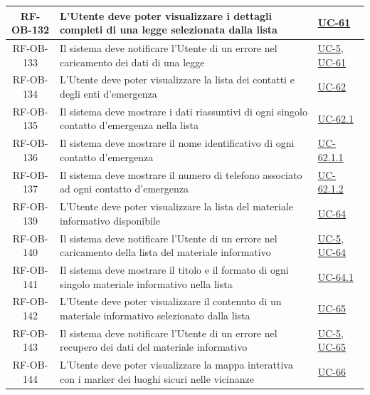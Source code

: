 \documentclass[a4paper,12pt]{article}
\begin{document}
\begin{center}
\begin{longtable}{|c|p{8.5cm}|>{\centering\arraybackslash}p{4cm}|}
RF-OB-132 & L'Utente deve poter visualizzare i dettagli completi di una legge selezionata dalla lista & \hyperref[sec:UC-61]{UC-61} \\
\hline

RF-OB-133 & Il sistema deve notificare l'Utente di un errore nel caricamento dei dati di una legge & \hyperref[sec:UC-5]{UC-5}, \hyperref[sec:UC-61]{UC-61} \\
\hline

RF-OB-134 & L'Utente deve poter visualizzare la lista dei contatti e degli enti d'emergenza & \hyperref[sec:UC-62]{UC-62} \\
\hline

RF-OB-135 & Il sistema deve mostrare i dati riassuntivi di ogni singolo contatto d'emergenza nella lista & \hyperref[subsec:UC-62.1]{UC-62.1} \\
\hline

RF-OB-136 & Il sistema deve mostrare il nome identificativo di ogni contatto d'emergenza & \hyperref[subsec:UC-62.1.1]{UC-62.1.1} \\
\hline

RF-OB-137 & Il sistema deve mostrare il numero di telefono associato ad ogni contatto d'emergenza & \hyperref[subsec:UC-62.1.2]{UC-62.1.2} \\
\hline

RF-OB-139 & L'Utente deve poter visualizzare la lista del materiale informativo disponibile & \hyperref[sec:UC-64]{UC-64} \\
\hline

RF-OB-140 & Il sistema deve notificare l'Utente di un errore nel caricamento della lista del materiale informativo & \hyperref[sec:UC-5]{UC-5}, \hyperref[sec:UC-64]{UC-64} \\
\hline

RF-OB-141 & Il sistema deve mostrare il titolo e il formato di ogni singolo materiale informativo nella lista & \hyperref[subsec:UC-64.1]{UC-64.1} \\
\hline

RF-OB-142 & L'Utente deve poter visualizzare il contenuto di un materiale informativo selezionato dalla lista & \hyperref[sec:UC-65]{UC-65} \\
\hline

RF-OB-143 & Il sistema deve notificare l'Utente di un errore nel recupero dei dati del materiale informativo & \hyperref[sec:UC-5]{UC-5}, \hyperref[sec:UC-65]{UC-65} \\
\hline

RF-OB-144 & L'Utente deve poter visualizzare la mappa interattiva con i marker dei luoghi sicuri nelle vicinanze & \hyperref[sec:UC-66]{UC-66} \\
\hline


\end{longtable}
\end{center}
\end{document}
